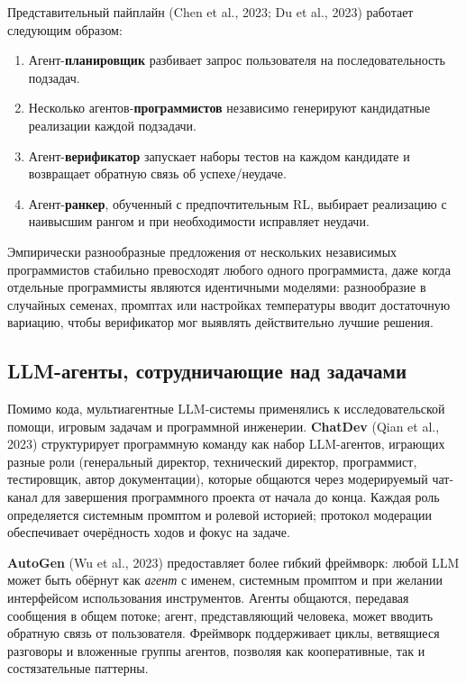 Представительный пайплайн (Chen et al., 2023; Du et al., 2023) работает
следующим образом:
\begin{enumerate}[leftmargin=*]
  \item Агент-\textbf{планировщик} разбивает запрос пользователя на
    последовательность подзадач.
  \item Несколько агентов-\textbf{программистов} независимо генерируют
    кандидатные реализации каждой подзадачи.
  \item Агент-\textbf{верификатор} запускает наборы тестов на каждом кандидате
    и возвращает обратную связь об успехе/неудаче.
  \item Агент-\textbf{ранкер}, обученный с предпочтительным RL, выбирает
    реализацию с наивысшим рангом и при необходимости исправляет неудачи.
\end{enumerate}
Эмпирически разнообразные предложения от нескольких независимых программистов
стабильно превосходят любого одного программиста, даже когда отдельные
программисты являются идентичными моделями: разнообразие в случайных семенах, промптах или
настройках температуры вводит достаточную вариацию, чтобы верификатор
мог выявлять действительно лучшие решения.

\subsection{LLM-агенты, сотрудничающие над задачами}

Помимо кода, мультиагентные LLM-системы применялись к исследовательской
помощи, игровым задачам и программной инженерии. \textbf{ChatDev}
(Qian et al., 2023) структурирует программную команду как набор LLM-агентов,
играющих разные роли (генеральный директор, технический директор, программист, тестировщик, автор документации),
которые общаются через модерируемый чат-канал для завершения программного
проекта от начала до конца. Каждая роль определяется системным промптом и
ролевой историей; протокол модерации обеспечивает очерёдность ходов
и фокус на задаче.

\textbf{AutoGen} (Wu et al., 2023) предоставляет более
гибкий фреймворк: любой LLM может быть обёрнут как \emph{агент} с
именем, системным промптом и при желании интерфейсом использования инструментов. Агенты
общаются, передавая сообщения в общем потоке; агент, представляющий
человека, может вводить обратную связь от пользователя. Фреймворк поддерживает циклы, ветвящиеся
разговоры и вложенные группы агентов, позволяя как кооперативные, так и
состязательные паттерны.

